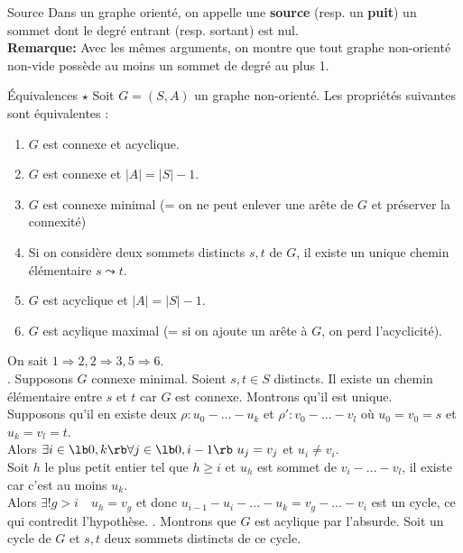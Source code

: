 \documentclass[french, 11pt]{article}
\begin{document}
\begin{defi}{Source}{}
    Dans un graphe orienté, on appelle une \textbf{source} (resp. un \textbf{puit}) un sommet dont le degré entrant (resp. sortant) est nul.\\
    \textbf{Remarque:} Avec les mêmes arguments, on montre que tout graphe non-orienté non-vide possède au moins un sommet de degré au plus 1.
\end{defi}

\pagebreak

\begin{prop}{Équivalences $\star$}{}
    Soit $G=(S,A)$ un graphe non-orienté. Les propriétés suivantes sont équivalentes :
    \begin{enumerate}[topsep=0pt,itemsep=-0.9 ex]
        \item $G$ est connexe et acyclique.
        \item $G$ est connexe et $|A|=|S|-1$.
        \item $G$ est connexe minimal (= on ne peut enlever une arête de $G$ et préserver la connexité)
        \item Si on considère deux sommets distincts $s,t$ de $G$, il existe un unique chemin élémentaire $s\leadsto t$.
        \item $G$ est acyclique et $|A|=|S|-1$.
        \item $G$ est acylique maximal (= si on ajoute un arête à $G$, on perd l'acyclicité).
    \end{enumerate}
    \tcblower
    On sait $1\Rightarrow2,2\Rightarrow3,5\Rightarrow6$.\\
    . Supposons $G$ connexe minimal. Soient $s,t\in S$ distincts. Il existe un chemin élémentaire entre $s$ et $t$ car $G$ est connexe. Montrons qu'il est unique.\\
    Supposons qu'il en existe deux $\rho:u_0-...-u_k$ et $\rho':v_0-...-v_l$ où $u_0=v_0=s$ et $u_k=v_l=t$.\\
    Alors $\exists i \in \lb0,k\rb \forall j \in \lb 0, i-1 \rb ~ u_j = v_j$ et $u_i\neq v_i$.\\
    Soit $h$ le plus petit entier tel que $h\geq i$ et $u_h$ est sommet de $v_i-...-v_l$, il existe car c'est au moins $u_k$.\\
    Alors $\exists!g>i \quad u_h=v_g$  et donc $u_{i-1}-u_i-...-u_k=v_g-...-v_i$ est un cycle, ce qui contredit l'hypothèse.\n
    . Montrons que $G$ est acylique par l'absurde. Soit un cycle de $G$ et $s,t$ deux sommets distincts de ce cycle.

\end{prop}
\end{document}
